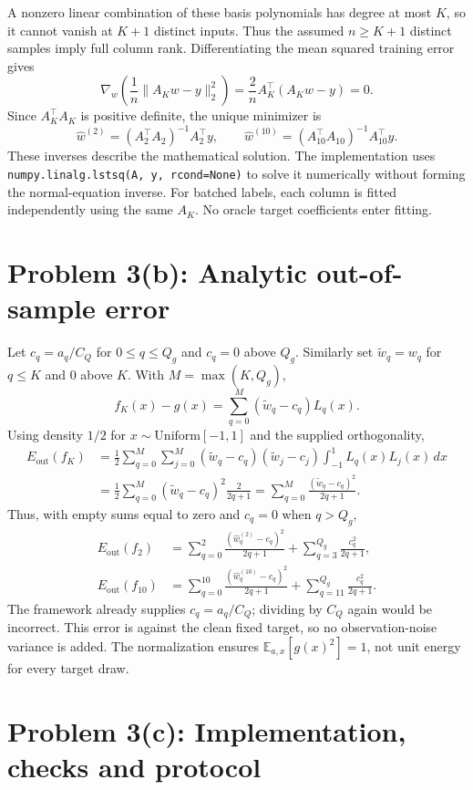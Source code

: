 \documentclass[11pt,a4paper]{article}
\newcommand{\Eout}{E_{\mathrm{out}}}
\newcommand{\method}{\texttt}
\begin{document}
A nonzero linear combination of these basis polynomials has degree at most $K$, so it cannot vanish at $K+1$ distinct inputs. Thus the assumed $n\ge K+1$ distinct samples imply full column rank. Differentiating the mean squared training error gives
\[
\nabla_w\left(\frac1n\|A_Kw-y\|_2^2\right)=\frac2nA_K^\top(A_Kw-y)=0.
\]
Since $A_K^\top A_K$ is positive definite, the unique minimizer is
\[
\boxed{\widehat w^{(2)}=(A_2^\top A_2)^{-1}A_2^\top y,\qquad
\widehat w^{(10)}=(A_{10}^\top A_{10})^{-1}A_{10}^\top y.}
\]
These inverses describe the mathematical solution. The implementation uses \method{numpy.linalg.lstsq(A, y, rcond=None)} to solve it numerically without forming the normal-equation inverse. For batched labels, each column is fitted independently using the same $A_K$. No oracle target coefficients enter fitting.

\section*{Problem 3(b): Analytic out-of-sample error}
Let $c_q=a_q/C_Q$ for $0\le q\le Q_g$ and $c_q=0$ above $Q_g$. Similarly set $\widetilde w_q=w_q$ for $q\le K$ and $0$ above $K$. With $M=\max(K,Q_g)$,
\[
f_K(x)-g(x)=\sum_{q=0}^{M}(\widetilde w_q-c_q)L_q(x).
\]
Using density $1/2$ for $x\sim\mathrm{Uniform}[-1,1]$ and the supplied orthogonality,
\begin{align*}
\Eout(f_K)
&=\frac12\sum_{q=0}^{M}\sum_{j=0}^{M}(\widetilde w_q-c_q)(\widetilde w_j-c_j)
\int_{-1}^{1}L_q(x)L_j(x)\,dx\\
&=\frac12\sum_{q=0}^{M}(\widetilde w_q-c_q)^2\frac{2}{2q+1}
 =\boxed{\sum_{q=0}^{M}\frac{(\widetilde w_q-c_q)^2}{2q+1}.}
\end{align*}
Thus, with empty sums equal to zero and $c_q=0$ when $q>Q_g$,
\[
\boxed{\begin{aligned}
\Eout(f_2)&=\sum_{q=0}^{2}\frac{(\widehat w^{(2)}_q-c_q)^2}{2q+1}
                +\sum_{q=3}^{Q_g}\frac{c_q^2}{2q+1},\\
\Eout(f_{10})&=\sum_{q=0}^{10}\frac{(\widehat w^{(10)}_q-c_q)^2}{2q+1}
                +\sum_{q=11}^{Q_g}\frac{c_q^2}{2q+1}.
\end{aligned}}
\]
The framework already supplies $c_q=a_q/C_Q$; dividing by $C_Q$ again would be incorrect. This error is against the clean fixed target, so no observation-noise variance is added. The normalization ensures $\mathbb E_{a,x}[g(x)^2]=1$, not unit energy for every target draw.

\clearpage
\section*{Problem 3(c): Implementation, checks and protocol}

\end{document}
